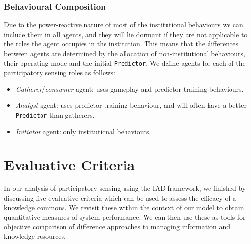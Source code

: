 
\subsubsection*{Behavioural Composition}

Due to the power-reactive nature of most of the institutional behaviours we
can include them in all agents, and they will lie dormant if they are not
applicable to the roles the agent occupies in the institution. This means that
the differences between agents are determined by the allocation of 
non-institutional behaviours, their operating mode and the initial
\texttt{Predictor}. We define agents for each of the participatory sensing
roles as follows:

\begin{itemize}
\item \emph{Gatherer}/\emph{consumer} agent: uses gameplay and predictor training behaviours.
\item \emph{Analyst} agent: uses predictor training behaviour, and will often have a better \texttt{Predictor} than gatherers.
\item \emph{Initiator} agent: only institutional behaviours.
\end{itemize}

\section{Evaluative Criteria}

In our analysis of participatory sensing using the \ac{IAD} framework, we finished by
discussing five evaluative criteria which can be used to assess the efficacy
of a knowledge commons. We revisit these within the context of our model to
obtain quantitative measures of system performance. We can then use these as
tools for objective comparison of difference approaches to managing
information and knowledge resources.

